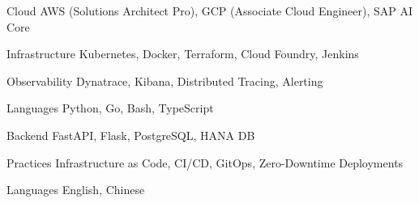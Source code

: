 

\begin{cvskills}

  \cvskill
    {Cloud} %
    {AWS (Solutions Architect Pro), GCP (Associate Cloud Engineer), SAP AI Core} %

  \cvskill
    {Infrastructure} %
    {Kubernetes, Docker, Terraform, Cloud Foundry, Jenkins} %

  \cvskill
    {Observability} %
    {Dynatrace, Kibana, Distributed Tracing, Alerting} %

  \cvskill
    {Languages} %
    {Python, Go, Bash, TypeScript} %

  \cvskill
    {Backend} %
    {FastAPI, Flask, PostgreSQL, HANA DB} %

  \cvskill
    {Practices} %
    {Infrastructure as Code, CI/CD, GitOps, Zero-Downtime Deployments} %

  \cvskill
    {Languages} %
    {English, Chinese} %


\end{cvskills}
